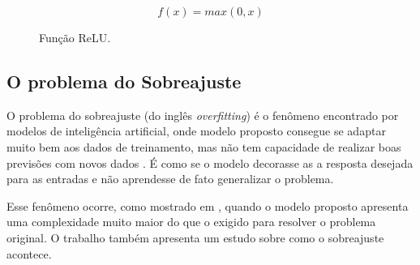 \begin{equation}
  f(x) = max(0,x)
  \label{fun:relu}
\end{equation}

\begin{figure}[!htb]
    \centering
    \caption{Função ReLU.}
\label{fig:relu}
\end{figure}

\subsection{O problema do Sobreajuste}
\label{sec:sobreajuste}
O problema do sobreajuste (do inglês \textit{overfitting}) é o fenômeno encontrado por modelos de inteligência artificial, onde modelo proposto consegue se adaptar muito bem aos dados de treinamento, mas não tem capacidade de realizar boas previsões com novos dados
\cite{nasrabadi2007pattern,abu2012learning, dietterich1995overfitting}. É como se o modelo decorasse as a resposta desejada para as entradas e não aprendesse de fato generalizar o problema.

Esse fenômeno ocorre, como mostrado em \cite{overfitting97lawrence}, quando o modelo proposto apresenta uma complexidade muito maior do que o exigido para resolver o problema original. O trabalho \cite{carlospedroviannalordelo2018} também apresenta um estudo sobre como o sobreajuste acontece.

